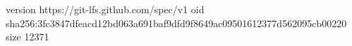 version https://git-lfs.github.com/spec/v1
oid sha256:3fc3847dfeacd12bd063a691baf9dfd9f8649ac09501612377d562095cb00220
size 12371

